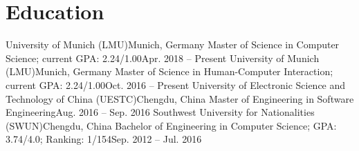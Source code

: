 \section{\textbf{Education}}
  \resumeSubHeadingListStart
    \resumeSubheading
      {University of Munich (LMU)}{Munich, Germany}
      {Master of Science in Computer Science; current GPA: 2.24/1.00}{Apr. 2018 -- Present}
    \resumeSubheading
      {University of Munich (LMU)}{Munich, Germany}
      {Master of Science in Human-Computer Interaction; current GPA: 2.24/1.00}{Oct. 2016 -- Present}
    \resumeSubheading
      {University of Electronic Science and Technology of China (UESTC)}{Chengdu, China}
      {Master of Engineering in Software Engineering}{Aug. 2016 -- Sep. 2016}
    \resumeSubheading
      {Southwest University for Nationalities (SWUN)}{Chengdu, China}
      {Bachelor of Engineering in Computer Science;  GPA: 3.74/4.0; Ranking: 1/154}{Sep. 2012 -- Jul. 2016}
  \resumeSubHeadingListEnd